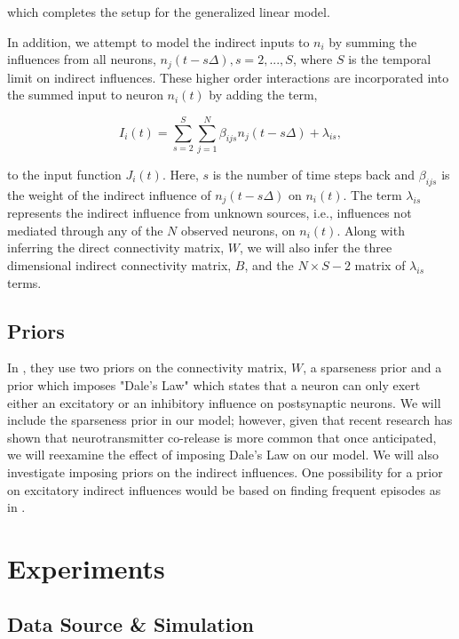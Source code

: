 \documentclass{article}
\begin{document}
which completes the setup for the generalized linear model. 

In addition, we attempt to model the indirect inputs to $n_i$ by summing the influences from all neurons, $n_j(t-s\Delta), s=2,...,S$, where $S$ is the temporal limit on indirect influences. These higher order interactions are incorporated into the summed input to neuron $n_i(t)$ by adding the term,

\begin{equation}
\label{new_term}
I_i(t)=\displaystyle\sum\limits_{s=2}^S\sum\limits_{j=1}^N \beta_{ijs}n_j(t-s\Delta) + \lambda_{is},
\end{equation}


to the input function $J_i(t)$. Here, $s$ is the number of time steps back and $\beta_{ijs}$ is the weight of the indirect influence of $n_j(t-s\Delta)$ on $n_i(t)$. The term $\lambda_{is}$ represents the indirect influence from unknown sources, i.e., influences not mediated through any of the $N$ observed neurons, on $n_i(t)$.  Along with inferring the direct connectivity matrix, $W$, we will also infer the three dimensional indirect connectivity matrix, $B$, and the $N\times S-2$ matrix of $\lambda_{is}$ terms.

\subsection{Priors}

In \citep{mishchencko2011}, they use two priors on the connectivity matrix, $W$, a sparseness prior and a prior which imposes "Dale's Law" which states that a neuron can only exert either an excitatory or an inhibitory influence on postsynaptic neurons. We will include the sparseness prior in our model; however, given that recent research has shown that neurotransmitter co-release is more common that once anticipated, we will reexamine the effect of imposing Dale's Law on our model. We will also investigate imposing priors on the indirect influences. One possibility for a prior on excitatory indirect influences would be based on finding frequent episodes as in \citep{patnaik2011}.

\section{Experiments}

\subsection{Data Source \& Simulation}
\end{document}
